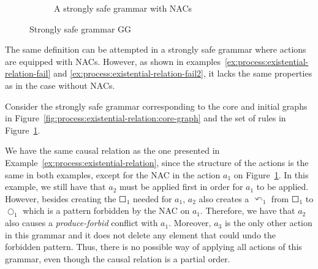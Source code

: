 \begin{example}
\begin{figure}[!ht]
\begin{subfigure}[t]{.5\textwidth}
    \caption{A strongly safe grammar with NACs}\label{fig:process:existential-relation:example-nacs}
  \end{subfigure}
  \caption{Strongly safe grammar GG}\label{fig:process:existential-relation}
\end{figure}
\end{example}

The same definition can be attempted in a strongly safe grammar where actions are equipped with NACs. However, as shown in examples~\ref{ex:process:existential-relation-fail} and \ref{ex:process:existential-relation-fail2}, it lacks the same properties as in the case without NACs.

\begin{example}\label{ex:process:existential-relation-fail}Consider the strongly safe grammar corresponding to the core and initial graphs in Figure~\ref{fig:process:existential-relation:core-graph} and the set of rules in Figure~\ref{fig:process:existential-relation:example-nacs}.

We have the same causal relation as the one presented in Example~\ref{ex:process:existential-relation}, since the structure of the actions is the same in both examples, except for the NAC in the action $a_1$ on Figure~\ref{fig:process:existential-relation:example-nacs}. In this example, we still have that $a_2$ must be applied first in order for $a_1$ to be applied. However, besides creating the $\Square_1$ needed for $a_1$, $a_2$ also creates a $\curvearrowleft_1$ from $\Square_1$ to
  $\Circle_1$ which is a pattern forbidden by the NAC on $a_1$. Therefore, we have that $a_2$ also causes a \emph{produce-forbid} conflict with $a_1$. Moreover, $a_3$ is the only other action in this grammar and it does not delete any element that could undo the forbidden pattern. Thus, there is no possible way of applying all actions of this grammar, even though the causal relation is a partial order.\end{example}

